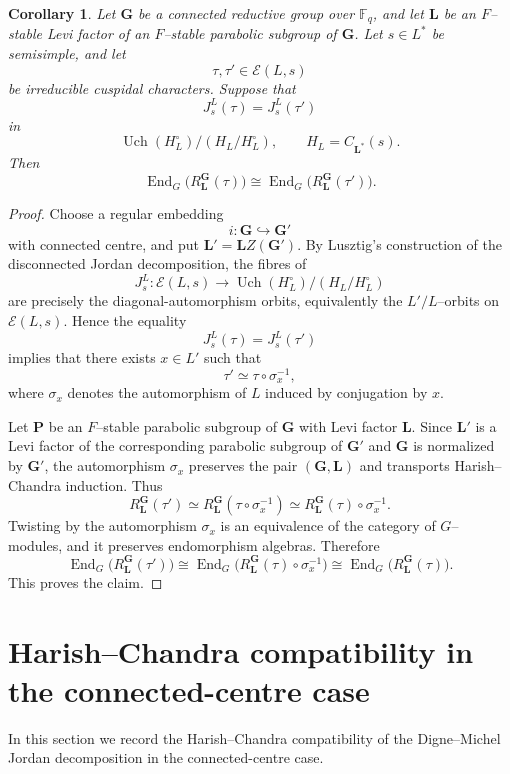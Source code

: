 \documentclass{amsart}
\theoremstyle{plain}
\numberwithin{equation}{section}
\newtheorem{corollary}[theorem]{Corollary}
\theoremstyle{definition}
\newcommand{\End}{\operatorname{End}}
\newcommand{\Uch}{\operatorname{Uch}}
\newcommand{\bG}{\mathbf{G}}
\newcommand{\bL}{\mathbf{L}}
\newcommand{\bP}{\mathbf{P}}
\begin{document}
\begin{corollary}\label{cor:end-algebras-same-JD-fiber}
Let $\bG$ be a connected reductive group over $\mathbb F_q$, and let
$\bL$ be an $F$--stable Levi factor of an $F$--stable parabolic subgroup of
$\bG$.  Let $s\in L^*$ be semisimple, and let
\[
\tau,\tau'\in \mathcal E(L,s)
\]
be irreducible cuspidal characters.  Suppose that
\[
J_s^L(\tau)=J_s^L(\tau')
\]
in
\[
\Uch(H_L^\circ)/(H_L/H_L^\circ),
\qquad
H_L=C_{\bL^*}(s).
\]
Then
\[
\End_G\bigl(R_{\bL}^{\bG}(\tau)\bigr)
\cong
\End_G\bigl(R_{\bL}^{\bG}(\tau')\bigr).
\]
\end{corollary}

\begin{proof}
Choose a regular embedding
\[
i:\bG\hookrightarrow \bG'
\]
with connected centre, and put $\bL'=\bL Z(\bG')$.  By Lusztig's construction of
the disconnected Jordan decomposition, the fibres of
\[
J_s^L:\mathcal E(L,s)\longrightarrow
\Uch(H_L^\circ)/(H_L/H_L^\circ)
\]
are precisely the diagonal-automorphism orbits, equivalently the $L'/L$--orbits
on $\mathcal E(L,s)$.  Hence the equality
\[
J_s^L(\tau)=J_s^L(\tau')
\]
implies that there exists $x\in L'$ such that
\[
\tau'\simeq \tau\circ \sigma_x^{-1},
\]
where $\sigma_x$ denotes the automorphism of $L$ induced by conjugation by $x$.

Let $\bP$ be an $F$--stable parabolic subgroup of $\bG$ with Levi factor $\bL$.
Since $\bL'$ is a Levi factor of the corresponding parabolic subgroup of $\bG'$
and $\bG$ is normalized by $\bG'$, the automorphism $\sigma_x$ preserves the pair
$(\bG,\bL)$ and transports Harish--Chandra induction.  Thus
\[
R_{\bL}^{\bG}(\tau')
\simeq
R_{\bL}^{\bG}(\tau\circ\sigma_x^{-1})
\simeq
R_{\bL}^{\bG}(\tau)\circ\sigma_x^{-1}.
\]
Twisting by the automorphism $\sigma_x$ is an equivalence of the category of
$G$--modules, and it preserves endomorphism algebras.  Therefore
\[
\End_G\bigl(R_{\bL}^{\bG}(\tau')\bigr)
\cong
\End_G\bigl(R_{\bL}^{\bG}(\tau)\circ\sigma_x^{-1}\bigr)
\cong
\End_G\bigl(R_{\bL}^{\bG}(\tau)\bigr).
\]
This proves the claim.
\end{proof}

\section{Harish--Chandra compatibility in the connected-centre case}
\label{sec:HC-compatible-JD-connected-centre}

In this section we record the Harish--Chandra compatibility of the
Digne--Michel Jordan decomposition in the connected-centre case.
\end{document}
